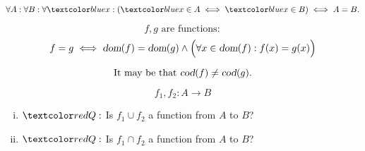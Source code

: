 
\begin{frame}{}
  \begin{axiom}
    \[
      \forall A: \forall B: \forall \blue{x}: (\blue{x} \in A \iff \blue{x} \in B) \iff A = B.
    \]
  \end{axiom}

  \pause
  \vspace{0.80cm}
  \begin{theorem}
    \[
      f, g \text{ are functions}:
    \]
    \[
      f = g \iff \textsl{dom}(f) = \textsl{dom}(g) \land \Big(\forall x \in \textsl{dom}(f): f(x) = g(x)\Big)
    \]
  \end{theorem}

  \pause
  \[
    \text{It may be that } \textsl{cod}(f) \neq \textsl{cod}(g).
  \]
\end{frame}

\begin{frame}{}
  \begin{definition}
    \[
      f_1, f_2: A \to B
    \]

    \begin{enumerate}[(i)]
      \centering
      \item $\red{Q}:$ Is $f_1 \cup f_2$ a function from $A$ to $B$?
      \item $\red{Q}:$ Is $f_1 \cap f_2$ a function from $A$ to $B$?
    \end{enumerate}
  \end{definition}
\end{frame}
